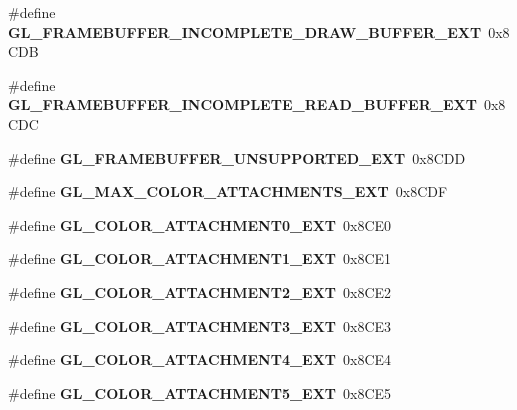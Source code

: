 \begin{DoxyCompactItemize}
\item 
\#define {\bfseries G\+L\+\_\+\+F\+R\+A\+M\+E\+B\+U\+F\+F\+E\+R\+\_\+\+I\+N\+C\+O\+M\+P\+L\+E\+T\+E\+\_\+\+D\+R\+A\+W\+\_\+\+B\+U\+F\+F\+E\+R\+\_\+\+E\+X\+T}~0x8\+C\+D\+B\label{_s_d_l__opengl_8h_a5b20e3d2e251ddc8a57536e5c90436ff}

\item 
\#define {\bfseries G\+L\+\_\+\+F\+R\+A\+M\+E\+B\+U\+F\+F\+E\+R\+\_\+\+I\+N\+C\+O\+M\+P\+L\+E\+T\+E\+\_\+\+R\+E\+A\+D\+\_\+\+B\+U\+F\+F\+E\+R\+\_\+\+E\+X\+T}~0x8\+C\+D\+C\label{_s_d_l__opengl_8h_a4eeea1011dd39c7962ccc429aed24d26}

\item 
\#define {\bfseries G\+L\+\_\+\+F\+R\+A\+M\+E\+B\+U\+F\+F\+E\+R\+\_\+\+U\+N\+S\+U\+P\+P\+O\+R\+T\+E\+D\+\_\+\+E\+X\+T}~0x8\+C\+D\+D\label{_s_d_l__opengl_8h_a2b67225cbc7d7c72deb5e8e5c19c81f0}

\item 
\#define {\bfseries G\+L\+\_\+\+M\+A\+X\+\_\+\+C\+O\+L\+O\+R\+\_\+\+A\+T\+T\+A\+C\+H\+M\+E\+N\+T\+S\+\_\+\+E\+X\+T}~0x8\+C\+D\+F\label{_s_d_l__opengl_8h_aa4c6dc169b490cfa81f19423ca65a1f5}

\item 
\#define {\bfseries G\+L\+\_\+\+C\+O\+L\+O\+R\+\_\+\+A\+T\+T\+A\+C\+H\+M\+E\+N\+T0\+\_\+\+E\+X\+T}~0x8\+C\+E0\label{_s_d_l__opengl_8h_a4ff278d72e0f56e9a713ef0dc40b744c}

\item 
\#define {\bfseries G\+L\+\_\+\+C\+O\+L\+O\+R\+\_\+\+A\+T\+T\+A\+C\+H\+M\+E\+N\+T1\+\_\+\+E\+X\+T}~0x8\+C\+E1\label{_s_d_l__opengl_8h_abb41a580a48b0db9ab09bd666b197c38}

\item 
\#define {\bfseries G\+L\+\_\+\+C\+O\+L\+O\+R\+\_\+\+A\+T\+T\+A\+C\+H\+M\+E\+N\+T2\+\_\+\+E\+X\+T}~0x8\+C\+E2\label{_s_d_l__opengl_8h_ae095e9224b140740da4120b4df6ee383}

\item 
\#define {\bfseries G\+L\+\_\+\+C\+O\+L\+O\+R\+\_\+\+A\+T\+T\+A\+C\+H\+M\+E\+N\+T3\+\_\+\+E\+X\+T}~0x8\+C\+E3\label{_s_d_l__opengl_8h_a5e1b0f6369ed1fec16d1a6a30f27b3e8}

\item 
\#define {\bfseries G\+L\+\_\+\+C\+O\+L\+O\+R\+\_\+\+A\+T\+T\+A\+C\+H\+M\+E\+N\+T4\+\_\+\+E\+X\+T}~0x8\+C\+E4\label{_s_d_l__opengl_8h_af6d67cab75dc9104ce5d26351a8df930}

\item 
\#define {\bfseries G\+L\+\_\+\+C\+O\+L\+O\+R\+\_\+\+A\+T\+T\+A\+C\+H\+M\+E\+N\+T5\+\_\+\+E\+X\+T}~0x8\+C\+E5\label{_s_d_l__opengl_8h_ab6cf2e09b26e4c491520a6ab2db51a25}


\end{DoxyCompactItemize}
